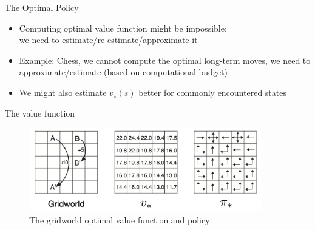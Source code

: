 \documentclass[10pt]{beamer}
\begin{document}
\begin{frame}{The Optimal Policy}

\begin{itemize}
\item Computing optimal value function might be {\color{uured}impossible}:\\ we need to estimate/re-estimate/approximate it
\item {\color{uured}Example}: Chess, we cannot compute the optimal long-term moves, we need to approximate/estimate (based on computational budget)\pause
\item We might also estimate $v_\star(s)$ better for commonly encountered states
\end{itemize}

\end{frame}

\begin{frame}{The value function}

\begin{figure}[h]
\centering
\includegraphics[width=0.9\textwidth]{fig/sutton_fig_3_8.png}
\caption{The gridworld optimal value function and policy}
\end{figure}

\end{frame}
\end{document}
